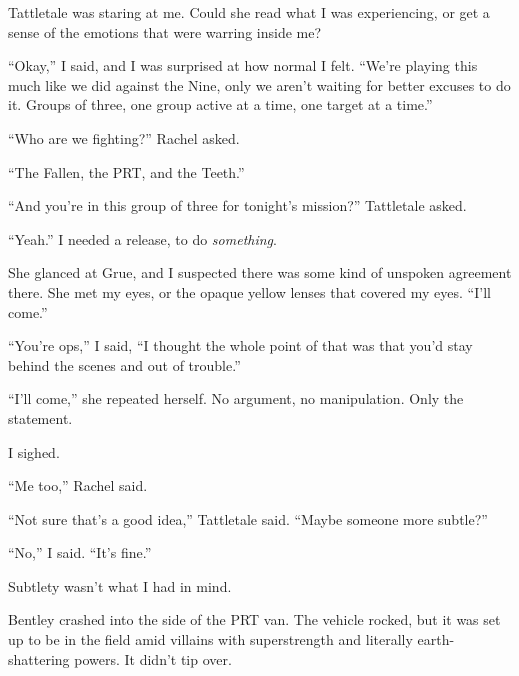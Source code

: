 Tattletale was staring at me.  Could she read what I was experiencing, or get a sense of the emotions that were warring inside me?



``Okay,'' I said, and I was surprised at how normal I felt.  ``We're playing this much like we did against the Nine, only we aren't waiting for better excuses to do it.  Groups of three, one group active at a time, one target at a time.''



``Who are we fighting?'' Rachel asked.



``The Fallen, the PRT, and the Teeth.''



``And you're in this group of three for tonight's mission?'' Tattletale asked.



``Yeah.''  I needed a release, to do \emph{something}.



She glanced at Grue, and I suspected there was some kind of unspoken agreement there.  She met my eyes, or the opaque yellow lenses that covered my eyes.  ``I'll come.''



``You're ops,'' I said, ``I thought the whole point of that was that you'd stay behind the scenes and out of trouble.''



``I'll come,'' she repeated herself.  No argument, no manipulation.  Only the statement.



I sighed.



``Me too,'' Rachel said.



``Not sure that's a good idea,'' Tattletale said.  ``Maybe someone more subtle?''



``No,'' I said.  ``It's fine.''



Subtlety wasn't what I had in mind.



\sectionbreak



Bentley crashed into the side of the PRT van.  The vehicle rocked, but it was set up to be in the field amid villains with superstrength and literally earth-shattering powers.  It didn't tip over.



